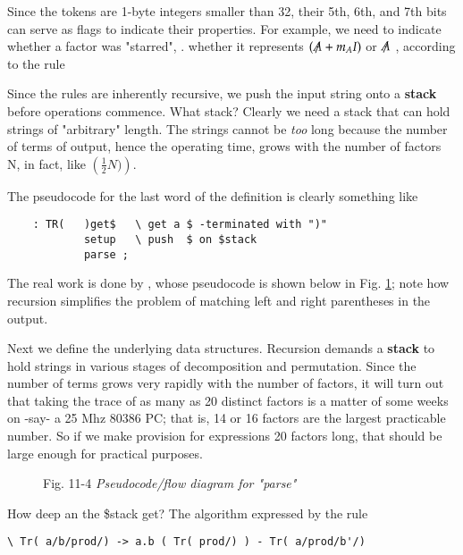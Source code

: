 Since the tokens are 1-byte integers smaller than 32, their 5th, 6th, and 7th bits can serve as flags to indicate their properties. For example, we need to indicate whether a factor was "starred", \ie. whether it represents $(\tr{A} + m_{A}I)$ or $\tr{A}$ , according to the rule

Since the rules are inherently recursive, we push the input string onto a \textbf{stack} before operations commence. What stack? Clearly we need a stack that can hold strings of "arbitrary" length. The strings cannot be \textit{too} long because the number of terms of output, hence the operating time, grows with the number of factors N, in fact, like $\left(\frac{1}{2}N)\right)$\bc{!}.

The pseudocode for the last word of the definition is clearly something like

\begin{lstlisting}
    : TR(   )get$   \ get a $ -terminated with ")"
            setup   \ push  $ on $stack
            parse ;
\end{lstlisting}

The real work is done by , whose pseudocode is shown below in Fig. \ref{fig:11_04}; note how recursion simplifies the problem of matching left and right parentheses in the output.

Next we define the underlying data structures. Recursion demands a \textbf{stack} to hold strings in various stages of decomposition and permutation. Since the number of terms grows very rapidly with the number of factors, it will turn out that taking the trace of as many as 20 distinct factors is a matter of some weeks on -say- a 25 Mhz 80386 PC; that is, 14 or 16 factors are the largest practicable number. So if we make provision for expressions 20 factors long, that should be large enough for practical purposes.

\begin{figure}
    \caption{Fig. 11-4 \textit{Pseudocode/flow diagram for "parse"}}
    \label{fig:11_04}
\end{figure}

How deep an the \$stack get? The algorithm expressed by the rule

\begin{verbatim}
\ Tr( a/b/prod/) -> a.b ( Tr( prod/) ) - Tr( a/prod/b'/)
\end{verbatim}

